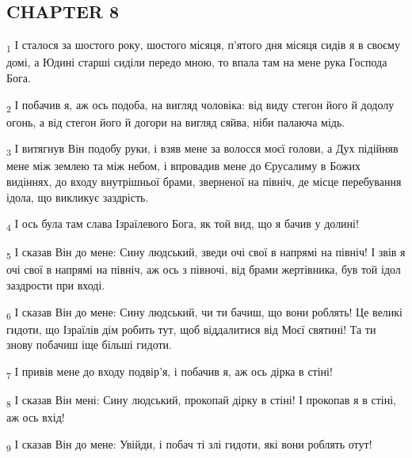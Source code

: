 \subsection{CHAPTER 8}
\begin{tcolorbox}
\textsubscript{1} І сталося за шостого року, шостого місяця, п'ятого дня місяця сидів я в своєму домі, а Юдині старші сиділи передо мною, то впала там на мене рука Господа Бога.
\end{tcolorbox}
\begin{tcolorbox}
\textsubscript{2} І побачив я, аж ось подоба, на вигляд чоловіка: від виду стегон його й додолу огонь, а від стегон його й догори на вигляд сяйва, ніби палаюча мідь.
\end{tcolorbox}
\begin{tcolorbox}
\textsubscript{3} І витягнув Він подобу руки, і взяв мене за волосся моєї голови, а Дух підійняв мене між землею та між небом, і впровадив мене до Єрусалиму в Божих видіннях, до входу внутрішньої брами, зверненої на північ, де місце перебування ідола, що викликує заздрість.
\end{tcolorbox}
\begin{tcolorbox}
\textsubscript{4} І ось була там слава Ізраїлевого Бога, як той вид, що я бачив у долині!
\end{tcolorbox}
\begin{tcolorbox}
\textsubscript{5} І сказав Він до мене: Сину людський, зведи очі свої в напрямі на північ! І звів я очі свої в напрямі на північ, аж ось з півночі, від брами жертівника, був той ідол заздрости при вході.
\end{tcolorbox}
\begin{tcolorbox}
\textsubscript{6} І сказав Він до мене: Сину людський, чи ти бачиш, що вони роблять! Це великі гидоти, що Ізраїлів дім робить тут, щоб віддалитися від Моєї святині! Та ти знову побачиш іще більші гидоти.
\end{tcolorbox}
\begin{tcolorbox}
\textsubscript{7} І привів мене до входу подвір'я, і побачив я, аж ось дірка в стіні!
\end{tcolorbox}
\begin{tcolorbox}
\textsubscript{8} І сказав Він мені: Сину людський, прокопай дірку в стіні! І прокопав я в стіні, аж ось вхід!
\end{tcolorbox}
\begin{tcolorbox}
\textsubscript{9} І сказав Він до мене: Увійди, і побач ті злі гидоти, які вони роблять отут!
\end{tcolorbox}
